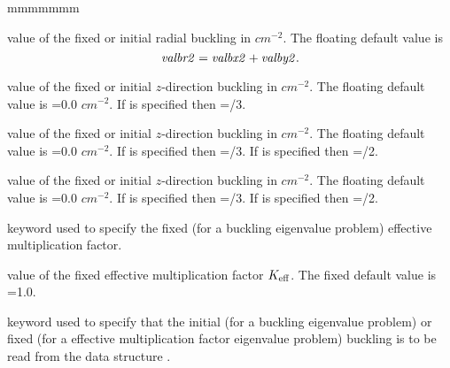 \begin{ListeDeDescription}{mmmmmmm}
\item[\dusa{valbr2}] value of the fixed or initial radial buckling in
$cm^{-2}$. The floating default value is
$${\it valbr2}={\it valbx2}+{\it valby2}.$$

\item[\dusa{valbz2}] value of the fixed or initial $z$-direction buckling in
$cm^{-2}$. The floating default value is =0.0 $cm^{-2}$. If
 is specified then =/3.

\item[\dusa{valbx2}] value of the fixed or initial $z$-direction buckling in
$cm^{-2}$. The floating default value is =0.0 $cm^{-2}$. If
 is specified then =/3. If  is
specified then =/2.

\item[\dusa{valby2}] value of the fixed or initial $z$-direction buckling in
$cm^{-2}$. The floating default value is =0.0 $cm^{-2}$. If
 is specified then =/3. If  is
specified then =/2.

\item[\moc{KEFF}] keyword used to specify the fixed (for a buckling eigenvalue
problem) effective multiplication factor. 

\item[\dusa{valk}] value of the fixed effective multiplication factor $K_{\rm eff}$. The
fixed default value is =1.0.

\item[\moc{IDEM}] keyword used to specify that the initial (for a buckling
eigenvalue problem) or fixed (for a effective multiplication factor eigenvalue
problem) buckling is to be read from the data structure . 

\end{ListeDeDescription}
\eject
